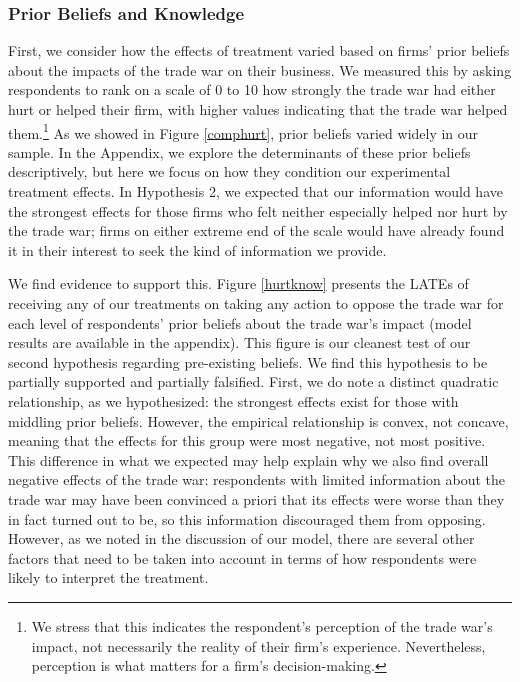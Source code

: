 \documentclass{article}
\begin{document}
\subsubsection{Prior Beliefs and Knowledge}

First, we consider how the effects of treatment varied based on firms' prior beliefs about the impacts of the trade war on their business. We measured this by asking respondents to rank on a scale of 0 to 10 how strongly the trade war had either hurt or helped their firm, with higher values indicating that the trade war helped them.\footnote{We stress that this indicates the respondent's perception of the trade war's impact, not necessarily the reality of their firm's experience. Nevertheless, perception is what matters for a firm's decision-making.} As we showed in Figure \ref{comphurt}, prior beliefs varied widely in our sample. In the Appendix, we explore the determinants of these prior beliefs descriptively, but here we focus on how they condition our experimental treatment effects. In Hypothesis 2, we expected that our information would have the strongest effects for those firms who felt neither especially helped nor hurt by the trade war; firms on either extreme end of the scale would have already found it in their interest to seek the kind of information we provide.

We find evidence to support this. Figure \ref{hurtknow} presents the LATEs of receiving any of our treatments on taking any action to oppose the trade war for each level of respondents' prior beliefs about the trade war's impact (model results are available in the appendix). This figure is our cleanest test of our second hypothesis regarding pre-existing beliefs. We find this hypothesis to be partially supported and partially falsified. First, we do note a distinct quadratic relationship, as we hypothesized: the strongest effects exist for those with middling prior beliefs. However, the  empirical relationship is convex, not concave, meaning that the effects for this group were most negative, not most positive. This difference in what we expected may help explain why we also find overall negative effects of the trade war: respondents with limited information about the trade war may have been convinced a priori that its effects were worse than they in fact turned out to be, so this information discouraged them from opposing. However, as we noted in the discussion of our model, there are several other factors that need to be taken into account in terms of how respondents were likely to interpret the treatment.
\end{document}
